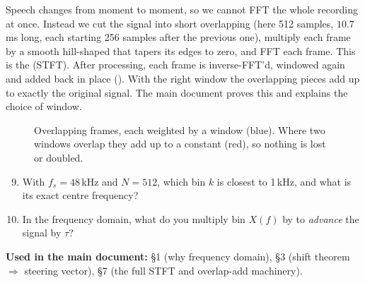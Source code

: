 \documentclass[11pt]{article}
\begin{document}
Speech changes from moment to moment, so we cannot FFT the whole recording at once. Instead we
cut the signal into short overlapping  (here 512 samples, $10.7$\,ms long,
each starting 256 samples after the previous one), multiply each frame by a smooth hill-shaped
 that tapers its edges to zero, and FFT each frame. This is the
 (STFT). After processing, each frame is
inverse-FFT'd, windowed again and added back in place (). With the right
window the overlapping pieces add up to exactly the original signal. The main document proves
this and explains the choice of window.

\begin{figure}[ht]
\centering
{}
\caption{Overlapping frames, each weighted by a window (blue). Where two windows overlap they add
up to a constant (red), so nothing is lost or doubled.}
\label{fig:frames}
\end{figure}

\begin{checkyourself}
\begin{enumerate}[nosep]
\setcounter{enumi}{8}
\item With $f_s=48$\,kHz and $N=512$, which bin $k$ is closest to 1\,kHz, and what is its exact
  centre frequency?
\item In the frequency domain, what do you multiply bin $X(f)$ by to \emph{advance} the signal by
  $\tau$?
\end{enumerate}
\end{checkyourself}

\begin{whereused}
\textbf{Used in the main document:} \S1 (why frequency domain), \S3 (shift theorem
$\Rightarrow$ steering vector), \S7 (the full STFT and overlap-add machinery).
\end{whereused}

\end{document}
